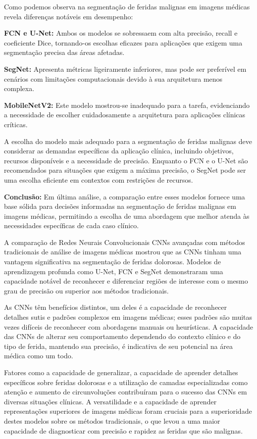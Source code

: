 Como podemos observa na segmentação de feridas malignas em imagens médicas revela diferenças notáveis em desempenho:

\textbf{\ac{FCN} e \ac{U-Net}:} Ambos os modelos se sobressaem com alta precisão, recall e coeficiente Dice, tornando-os escolhas eficazes para aplicações que exigem uma segmentação precisa das áreas afetadas.

\textbf{\ac{SegNet}:} Apresenta métricas ligeiramente inferiores, mas pode ser preferível em cenários com limitações computacionais devido à sua arquitetura menos complexa.

\textbf{\ac{MobileNetV2}:} Este modelo mostrou-se inadequado para a tarefa, evidenciando a necessidade de escolher cuidadosamente a arquitetura para aplicações clínicas críticas.

A escolha do modelo mais adequado para a segmentação de feridas malignas deve considerar as demandas específicas da aplicação clínica, incluindo objetivos, recursos disponíveis e a necessidade de precisão. Enquanto o \ac{FCN} e o \ac{U-Net} são recomendados para situações que exigem a máxima precisão, o \ac{SegNet} pode ser uma escolha eficiente em contextos com restrições de recursos.


\textbf{Conclusão:} Em última análise, a comparação entre esses modelos fornece uma base sólida para decisões informadas na segmentação de feridas malignas em imagens médicas, permitindo a escolha de uma abordagem que melhor atenda às necessidades específicas de cada caso clínico.

A comparação de Redes Neurais Convolucionais \acp{CNN} avançadas com métodos tradicionais de análise de imagens médicas mostrou que as \acp{CNN} tinham uma vantagem significativa na segmentação de feridas dolorosas. Modelos de aprendizagem profunda como \ac{U-Net}, \ac{FCN} e \ac{SegNet} demonstraram uma capacidade notável de reconhecer e diferenciar regiões de interesse com o mesmo grau de precisão ou superior aos métodos tradicionais.

As \acp{CNN} têm benefícios distintos, um deles é a capacidade de reconhecer detalhes sutis e padrões complexos em imagens médicas; esses padrões são muitas vezes difíceis de reconhecer com abordagens manuais ou heurísticas. A capacidade das \acp{CNN} de alterar seu comportamento dependendo do contexto clínico e do tipo de ferida, mantendo sua precisão, é indicativa de seu potencial na área médica como um todo.

Fatores como a capacidade de generalizar, a capacidade de aprender detalhes específicos sobre feridas dolorosas e a utilização de camadas especializadas como atenção e aumento de circunvoluções contribuíram para o sucesso das \acp{CNN} em diversas situações clínicas. A versatilidade e a capacidade de aprender representações superiores de imagens médicas foram cruciais para a superioridade destes modelos sobre os métodos tradicionais, o que levou a uma maior capacidade de diagnosticar com precisão e rapidez as feridas que são malignas. \label{sec:perguntas}

